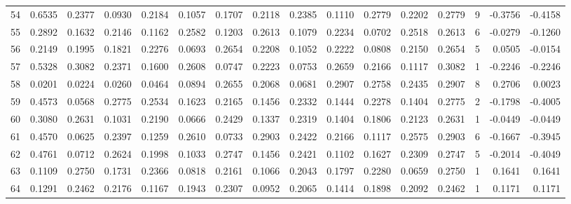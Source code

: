 \begin{tabular}{lrrrrrrrrrrrrrrr}
54  &      0.6535 &  0.2377 &  0.0930 &  0.2184 &  0.1057 &  0.1707 &  0.2118 &  0.2385 &  0.1110 &  0.2779 &   0.2202 &     0.2779 &      9 &                   -0.3756 &                    -0.4158 \\
55  &      0.2892 &  0.1632 &  0.2146 &  0.1162 &  0.2582 &  0.1203 &  0.2613 &  0.1079 &  0.2234 &  0.0702 &   0.2518 &     0.2613 &      6 &                   -0.0279 &                    -0.1260 \\
56  &      0.2149 &  0.1995 &  0.1821 &  0.2276 &  0.0693 &  0.2654 &  0.2208 &  0.1052 &  0.2222 &  0.0808 &   0.2150 &     0.2654 &      5 &                    0.0505 &                    -0.0154 \\
57  &      0.5328 &  0.3082 &  0.2371 &  0.1600 &  0.2608 &  0.0747 &  0.2223 &  0.0753 &  0.2659 &  0.2166 &   0.1117 &     0.3082 &      1 &                   -0.2246 &                    -0.2246 \\
58  &      0.0201 &  0.0224 &  0.0260 &  0.0464 &  0.0894 &  0.2655 &  0.2068 &  0.0681 &  0.2907 &  0.2758 &   0.2435 &     0.2907 &      8 &                    0.2706 &                     0.0023 \\
59  &      0.4573 &  0.0568 &  0.2775 &  0.2534 &  0.1623 &  0.2165 &  0.1456 &  0.2332 &  0.1444 &  0.2278 &   0.1404 &     0.2775 &      2 &                   -0.1798 &                    -0.4005 \\
60  &      0.3080 &  0.2631 &  0.1031 &  0.2190 &  0.0666 &  0.2429 &  0.1337 &  0.2319 &  0.1404 &  0.1806 &   0.2123 &     0.2631 &      1 &                   -0.0449 &                    -0.0449 \\
61  &      0.4570 &  0.0625 &  0.2397 &  0.1259 &  0.2610 &  0.0733 &  0.2903 &  0.2422 &  0.2166 &  0.1117 &   0.2575 &     0.2903 &      6 &                   -0.1667 &                    -0.3945 \\
62  &      0.4761 &  0.0712 &  0.2624 &  0.1998 &  0.1033 &  0.2747 &  0.1456 &  0.2421 &  0.1102 &  0.1627 &   0.2309 &     0.2747 &      5 &                   -0.2014 &                    -0.4049 \\
63  &      0.1109 &  0.2750 &  0.1731 &  0.2366 &  0.0818 &  0.2161 &  0.1066 &  0.2043 &  0.1797 &  0.2280 &   0.0659 &     0.2750 &      1 &                    0.1641 &                     0.1641 \\
64  &      0.1291 &  0.2462 &  0.2176 &  0.1167 &  0.1943 &  0.2307 &  0.0952 &  0.2065 &  0.1414 &  0.1898 &   0.2092 &     0.2462 &      1 &                    0.1171 &                     0.1171 \\

\end{tabular}
